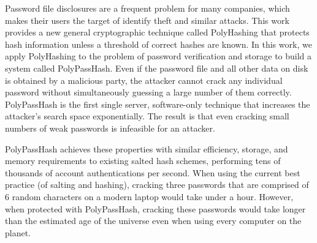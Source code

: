 Password file disclosures are a frequent problem for many companies, which
makes their users the target of identify theft and similar attacks.   This 
work provides a new general cryptographic technique called PolyHashing that 
protects hash information unless a threshold of correct hashes are known.
In this work, we apply PolyHashing to the problem of password verification and 
storage to build a system called PolyPassHash. %
Even if the password file and all other data on disk is obtained by a 
malicious party, the attacker cannot crack any individual password without 
simultaneously guessing a large number of them correctly.   PolyPassHash
is the first single server, software-only technique that increases
the attacker's search space exponentially.   The result is that even cracking 
small numbers of weak passwords is infeasible for an attacker.   

PolyPassHash achieves these properties with similar efficiency, storage,
and memory requirements to existing salted hash schemes,
performing
tens of thousands of account authentications per second.    
When using the current best practice (of salting and hashing), 
cracking three passwords that are comprised of 6 random characters on
a modern laptop would take under a hour.  However, when protected with
PolyPassHash, cracking these passwords would take longer than the estimated 
age of the universe even when using every computer on the planet.
